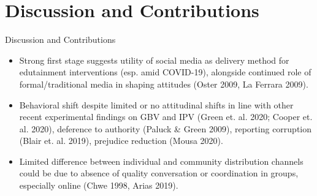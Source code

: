 \documentclass[10pt]{beamer}
\begin{document}
\section{Discussion and Contributions}
\begin{frame}{Discussion and Contributions}
\begin{itemize}
     \item Strong first stage suggests utility of social media as delivery method for edutainment interventions (esp. amid COVID-19), alongside continued role of formal/traditional media in shaping attitudes (Oster 2009, La Ferrara 2009).  \vspace{2mm}
     \item Behavioral shift despite limited or no attitudinal shifts in line with other recent experimental findings on GBV and IPV (Green et. al. 2020; Cooper et. al. 2020), deference to authority (Paluck \& Green 2009), reporting corruption (Blair et. al. 2019), prejudice reduction (Mousa 2020). \vspace{2mm}
     \item Limited difference between individual and community distribution channels could be due to absence of quality conversation or coordination in groups, especially online (Chwe 1998, Arias 2019). \vspace{2mm}
\end{itemize}
    
\end{frame}
\end{document}
